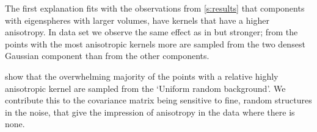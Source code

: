 				The first explanation fits with the observations from \cref{s:results} that components with eigenspheres with larger volumes, have kernels that have a higher anisotropy.
			In data set \baakmanThree we observe the same effect as in \ferdosiThree but stronger; from the points with the most anisotropic kernels more are sampled from the two densest Gaussian component than from the other components. 

	 show that the overwhelming majority of the points with a relative highly anisotropic kernel are sampled from the `Uniform random background'. We contribute this to the covariance matrix being sensitive to fine, random structures in the noise, that give the impression of anisotropy in the data where there is none.

